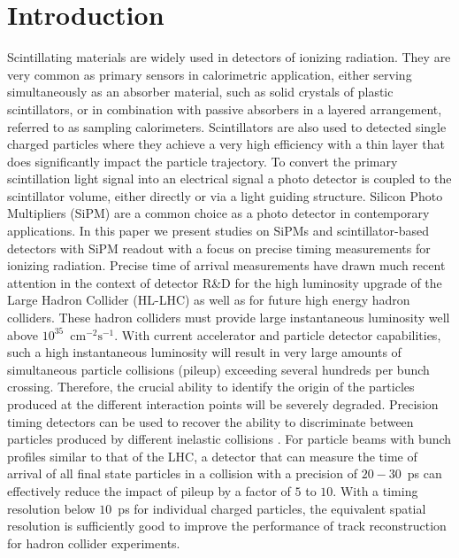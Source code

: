 \section{Introduction}
\label{sec:introduction}

Scintillating materials are widely used in detectors of ionizing radiation. 
They are very common as primary sensors in calorimetric application, 
either serving simultaneously as an absorber material, such as solid crystals of plastic scintillators, 
or in combination with passive absorbers in a layered arrangement, 
referred to as sampling calorimeters. Scintillators are also used to detected single charged 
particles where they achieve a very high efficiency with a thin layer 
that does significantly impact the particle trajectory.
To convert the primary scintillation light signal into an electrical signal 
a photo detector is coupled to the scintillator volume, either directly or 
via a light guiding structure. Silicon Photo Multipliers (SiPM) are a common 
choice as a photo detector in contemporary applications. In this paper we present 
studies on SiPMs and scintillator-based detectors with SiPM readout with a focus on 
precise timing measurements for ionizing radiation. 
%
%
Precise time of arrival measurements have drawn much recent attention in the 
context of detector R\&D for the high luminosity upgrade of the Large Hadron 
Collider (HL-LHC) as well as for future high energy hadron colliders.  
These hadron colliders must provide large 
instantaneous luminosity well above $10^{35}$~$\mathrm{cm}^{-2}\mathrm{s}^{-1}$.
With current accelerator and particle detector capabilities, such a high 
instantaneous luminosity will result in very large amounts
of simultaneous particle collisions (pileup) exceeding several hundreds per
bunch crossing. Therefore, the crucial ability to identify the origin 
of the particles produced at the different interaction points will be severely 
degraded. Precision timing detectors can be used to recover the ability to 
discriminate between particles produced by different inelastic collisions \cite{adielba}.
For particle beams with bunch profiles similar to that of the LHC, a detector 
that can measure the time of arrival of all final state particles in a collision
with a precision of $20-30$~ps can effectively reduce the impact of
pileup by a factor of $5$ to $10$. 
%
% 
% 
With a timing resolution below $10$~ps for individual charged particles, the equivalent spatial 
resolution is sufficiently good to improve the performance of 
track reconstruction \cite{4dtracking} for hadron collider experiments.
